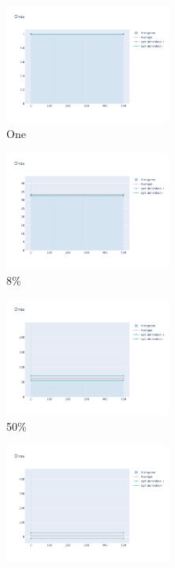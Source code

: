 \documentclass[12pt, fleqn]{report}                             %
\theoremstyle{break}                                            %
\begin{document}
      \begin{figure}[ht!]
        \centering
        \begin{subfigure}[b]{0.4\linewidth}
          \includegraphics[width=0.6\textwidth]{Images/2/dia-a.png}
          \caption{One}
        \end{subfigure}
        \begin{subfigure}[b]{0.4\linewidth}
          \includegraphics[width=0.6\textwidth]{Images/2/dia-b.png}
          \caption{8\%}
        \end{subfigure}
        \begin{subfigure}[b]{0.4\linewidth}
          \includegraphics[width=0.6\textwidth]{Images/2/dia-c.png}
          \caption{50\%}
        \end{subfigure}
        \begin{subfigure}[b]{0.4\linewidth}
          \includegraphics[width=0.6\textwidth]{Images/2/dia-d.png}

\end{subfigure}
\end{figure}
\end{document}
